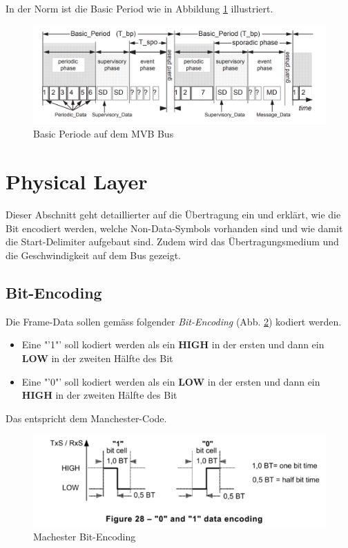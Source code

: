 In der Norm ist die Basic Period wie in Abbildung \ref{fig:BasicPeriod} illustriert.

\begin{figure}[H]
    \centering
    \includegraphics[width=0.9\linewidth]{Figures/Chap2/Grundlagen/BasicPeriod.png}
    \caption{Basic Periode auf dem MVB Bus}
    \label{fig:BasicPeriod}
\end{figure}


\section{Physical Layer}

Dieser Abschnitt geht detaillierter auf die Übertragung ein und erklärt, wie die Bit encodiert werden, welche Non-Data-Symbols vorhanden sind und wie damit die Start-Delimiter aufgebaut sind. Zudem wird das Übertragungsmedium und die Geschwindigkeit auf dem Bus gezeigt.

\subsection{Bit-Encoding}
\label{sub:BitEncoding}
Die Frame-Data sollen gemäss folgender \textit{Bit-Encoding} (Abb. \ref{fig:manchester_Bit_Encoding}) kodiert werden.

\begin{itemize}
    \item Eine "'1"' soll kodiert werden als ein \textbf{HIGH} in der ersten und dann ein \textbf{LOW} in der zweiten Hälfte des Bit
    \item Eine "'0"' soll kodiert werden als ein \textbf{LOW} in der ersten und dann ein \textbf{HIGH} in der zweiten Hälfte des Bit
\end{itemize}

Das entspricht dem Manchester-Code.

 
\begin{figure}[H]
    \centering
    \includegraphics[width = 0.7 \textwidth]{Figures/Chap2/Grundlagen/MVB_DOKU/Layer/Bit_Encoding.png}
    \caption{Machester Bit-Encoding}
    \label{fig:manchester_Bit_Encoding}
\end{figure}

